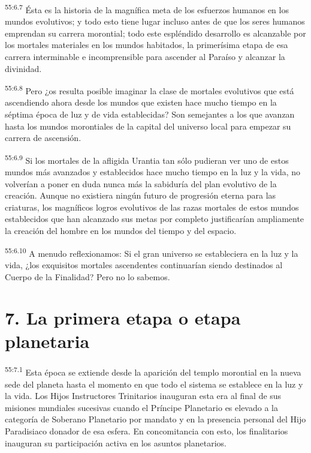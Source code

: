 \par
\textsuperscript{55:6.7} Ésta es la historia de la magnífica meta de los esfuerzos humanos en los mundos evolutivos; y todo esto tiene lugar incluso antes de que los seres humanos emprendan su carrera morontial; todo este espléndido desarrollo es alcanzable por los mortales materiales en los mundos habitados, la primerísima etapa de esa carrera interminable e incomprensible para ascender al Paraíso y alcanzar la divinidad.

\par
\textsuperscript{55:6.8} Pero ¿os resulta posible imaginar la clase de mortales evolutivos que está ascendiendo ahora desde los mundos que existen hace mucho tiempo en la séptima época de luz y de vida establecidas? Son semejantes a los que avanzan hasta los mundos morontiales de la capital del universo local para empezar su carrera de ascensión.

\par
\textsuperscript{55:6.9} Si los mortales de la afligida Urantia tan sólo pudieran ver uno de estos mundos más avanzados y establecidos hace mucho tiempo en la luz y la vida, no volverían a poner en duda nunca más la sabiduría del plan evolutivo de la creación. Aunque no existiera ningún futuro de progresión eterna para las criaturas, los magníficos logros evolutivos de las razas mortales de estos mundos establecidos que han alcanzado sus metas por completo justificarían ampliamente la creación del hombre en los mundos del tiempo y del espacio.

\par
\textsuperscript{55:6.10} A menudo reflexionamos: Si el gran universo se estableciera en la luz y la vida, ¿los exquisitos mortales ascendentes continuarían siendo destinados al Cuerpo de la Finalidad? Pero no lo sabemos.

\section*{7. La primera etapa o etapa planetaria}
\par
\textsuperscript{55:7.1} Esta época se extiende desde la aparición del templo morontial en la nueva sede del planeta hasta el momento en que todo el sistema se establece en la luz y la vida. Los Hijos Instructores Trinitarios inauguran esta era al final de sus misiones mundiales sucesivas cuando el Príncipe Planetario es elevado a la categoría de Soberano Planetario por mandato y en la presencia personal del Hijo Paradisiaco donador de esa esfera. En concomitancia con esto, los finalitarios inauguran su participación activa en los asuntos planetarios.

